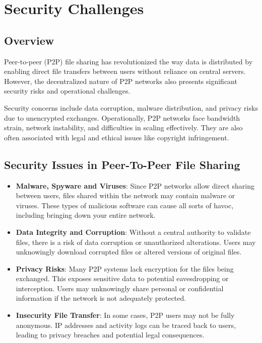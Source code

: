 \section{Security Challenges}

\subsection{Overview}
Peer-to-peer (P2P) file sharing has revolutionized the way data is distributed by enabling direct file transfers between users without reliance on central servers. However, the decentralized nature of P2P networks also presents significant security risks and operational challenges.

\vspace{1em}
\noindent Security concerns include data corruption, malware distribution, and privacy risks due to unencrypted exchanges. Operationally, P2P networks face bandwidth strain, network instability, and difficulties in scaling effectively. They are also often associated with legal and ethical issues like copyright infringement.

\subsection{Security Issues in Peer-To-Peer File Sharing}

\begin{itemize}
    \item \textbf{Malware, Spyware and Viruses}: Since P2P networks allow direct sharing between users, files shared within the network may contain malware or viruses. These types of malicious software can cause all sorts of havoc, including bringing down your entire network. 
    \item \textbf{Data Integrity and Corruption}: Without a central authority to validate files, there is a risk of data corruption or unauthorized alterations. Users may unknowingly download corrupted files or altered versions of original files.
    \item \textbf{Privacy Risks}: Many P2P systems lack encryption for the files being exchanged. This exposes sensitive data to potential eavesdropping or interception. Users may unknowingly share personal or confidential information if the network is not adequately protected.
    \item \textbf{Insecurity File Transfer}: In some cases, P2P users may not be fully anonymous. IP addresses and activity logs can be traced back to users, leading to privacy breaches and potential legal consequences.
\end{itemize}


